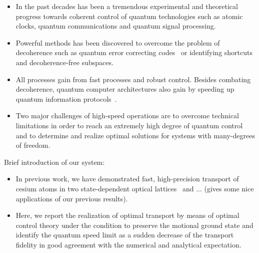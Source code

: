\documentclass[aps,pra,reprint,a4paper,nofootinbib,superscriptaddress,numbers,longbibliography,showpacs,showkeys,floatfix]{revtex4-1}
\begin{document}
\begin{itemize}
    \item In the past decades has been a tremendous experimental and theoretical progress towards coherent control of quantum technologies such as atomic clocks, quantum communications and quantum signal processing.
    \item Powerful methods has been discovered to overcome the problem of decoherence such as quantum error correcting codes~\cite{Kitaev:1997} or identifying shortcuts~\cite{Bason:2012, Chen:2010d} and decoherence-free subspaces.
    \item All processes gain from fast processes and robust control. Besides combating decoherence, quantum computer architectures also gain by speeding up quantum information protocols~\cite{Van-Meter:2013, Kielpinski:2002, Monroe:2013, Weitenberg:2011a}.
    \item Two major challenges of high-speed operations are to overcome technical limitations in order to reach an extremely high degree of quantum control and to determine and realize optimal solutions for systems with many-degrees of freedom.
    
\end{itemize}
 
Brief introduction of our system: 
\begin{itemize}
    \item In previous work, we have demonstrated fast, high-precision transport of cesium atoms in two state-dependent optical lattices~\cite{Robens:2018} and ... (gives some nice applications of our previous results). 
    \item Here, we report the realization of optimal transport by means of optimal control theory under the condition to preserve the motional ground state and identify the quantum speed limit as a sudden decrease of the transport fidelity in good agreement with the numerical and analytical expectation. 
\end{itemize}
\end{document}
